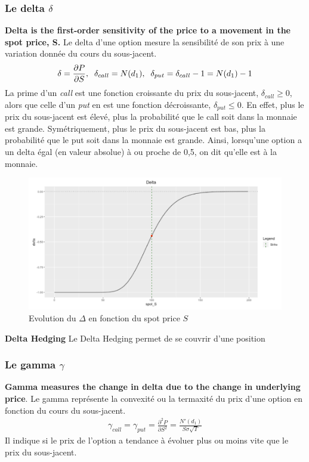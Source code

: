 \documentclass[a4paper]{article}
\begin{document}
 \subsubsection{Le delta $\delta$}
 \textbf{Delta is the first-order sensitivity of the price to a movement in the spot price, S.}
 Le delta d'une option mesure la sensibilité de son prix à une variation donnée du cours du sous-jacent.
 \begin{align*}
     \delta = \frac{\partial P}{\partial S}, \hspace{2mm} \delta_{call} = N(d_1), \hspace{2mm} \delta_{put} = \delta_{call} - 1 = N(d_1) - 1
 \end{align*}
La prime d'un \textit{call} est une fonction croissante du prix du sous-jacent, $\delta_{call} \geq 0$, alors que celle d'un \textit{put} en est une fonction décroissante, $\delta_{put} \leq 0$. En effet, plus le prix du sous-jacent est élevé, plus la probabilité que le call soit dans la monnaie est grande. Symétriquement, plus le prix du sous-jacent est bas, plus la probabilité que le put soit dans la monnaie est grande. Ainsi, lorsqu'une option a un delta égal (en valeur absolue) à ou proche de 0,5, on dit qu'elle est à la monnaie. 
\begin{figure}[H]
    \centering
    \includegraphics[scale=0.6]{delta.png}
    \caption{Evolution du $\Delta$ en fonction du spot price $S$}
    \label{fig:enter-label}
\end{figure}

\textbf{Delta Hedging} Le Delta Hedging permet de se couvrir d'une position 
\subsubsection{Le gamma $\gamma$}
\textbf{Gamma measures the change in delta due to the change in underlying price}. Le gamma représente la convexité ou la termaxité du prix d'une option en fonction du cours du sous-jacent.
\begin{align*}
    \gamma_{call} = \gamma_{put} = \frac{\partial ^2 P}{\partial S ^2} = \frac{N'(d_1)}{S \sigma \sqrt{T}}
\end{align*}
Il indique si le prix de l'option a tendance à évoluer plus ou moins vite que le prix du sous-jacent.
\end{document}
